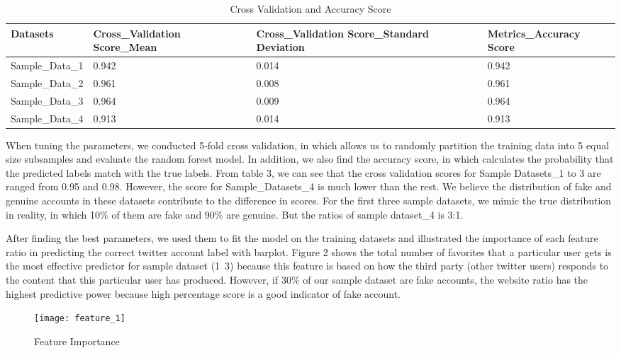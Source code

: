 \documentclass[a4paper, 12pt]{report}
\begin{document}
\begin{table}[h!]
	\caption{Cross Validation and Accuracy Score}
	\centering
	\begin{tabular}{p{3cm} |p{3.5cm}|p{3.5cm}|p{3.5cm}}	
		\hline
		Datasets & Cross\_Validation
		Score\_Mean    & Cross\_Validation
		Score\_Standard Deviation
		& Metrics\_Accuracy
		Score\\
		\hline
		Sample\_Data\_1 & 0.942    &0.014 & 0.942\\
		\hline
		Sample\_Data\_2 & 0.961    &0.008 & 0.961\\
		\hline
		Sample\_Data\_3 & 0.964    &0.009 & 0.964\\
		\hline
		Sample\_Data\_4 & 0.913    &0.014 & 0.913\\
		\hline
	\end{tabular}
\end{table}

\noindent When tuning the parameters, we conducted 5-fold cross validation, in which allows us to randomly partition the training data into 5 equal size subsamples and evaluate the random forest model. In addition, we also find the accuracy score, in which calculates the probability that the predicted labels match with the true labels. From table 3, we can see that the cross validation scores for Sample Datasets\_1 to 3 are ranged from 0.95 and 0.98. However, the score for Sample\_Datasets\_4 is much lower than the rest. We believe the distribution of fake and genuine accounts in these datasets contribute to the difference in scores. For the first three sample datasets, we mimic the true distribution in reality, in which 10\% of them are fake and 90\% are genuine. But the ratios of sample dataset\_4 is 3:1. \par

\noindent After finding the best parameters, we used them to fit the model on the training datasets and illustrated the importance of each feature ratio in predicting the correct twitter account label with barplot. Figure 2 shows the total number of favorites that a particular user gets is the most effective predictor for sample dataset (1~3) because this feature is based on how the third party (other twitter users) responds to the content that this particular user has produced. However, if 30\% of our sample dataset are fake accounts, the website ratio has the highest predictive power because high percentage score is a good indicator of fake account.  

\begin{figure}[h!]
	\centering
	\texttt{[image: feature\_1]}
	\caption{Feature Importance}
\end{figure}
\end{document}
